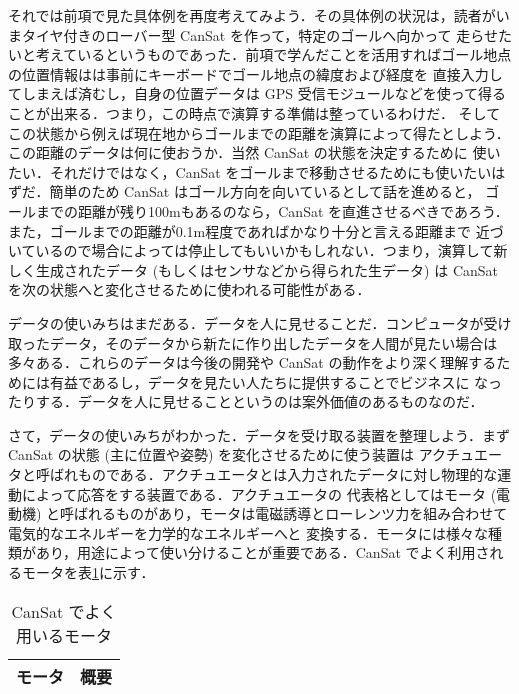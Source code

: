\documentclass[dvipdfmx]{jsarticle}
\begin{document}
それでは前項で見た具体例を再度考えてみよう．その具体例の状況は，読者がいまタイヤ付きのローバー型 CanSat を作って，特定のゴールへ向かって
走らせたいと考えているというものであった．前項で学んだことを活用すればゴール地点の位置情報はは事前にキーボードでゴール地点の緯度および経度を
直接入力してしまえば済むし，自身の位置データは GPS 受信モジュールなどを使って得ることが出来る．つまり，この時点で演算する準備は整っているわけだ．
そしてこの状態から例えば現在地からゴールまでの距離を演算によって得たとしよう．この距離のデータは何に使おうか．当然 CanSat の状態を決定するために
使いたい．それだけではなく，CanSat をゴールまで移動させるためにも使いたいはずだ．簡単のため CanSat はゴール方向を向いているとして話を進めると，
ゴールまでの距離が残り100mもあるのなら，CanSat を直進させるべきであろう．また，ゴールまでの距離が0.1m程度であればかなり十分と言える距離まで
近づいているので場合によっては停止してもいいかもしれない．つまり，演算して新しく生成されたデータ (もしくはセンサなどから得られた生データ) は
CanSat を次の状態へと変化させるために使われる可能性がある．

データの使いみちはまだある．データを人に見せることだ．コンピュータが受け取ったデータ，そのデータから新たに作り出したデータを人間が見たい場合は
多々ある．これらのデータは今後の開発や CanSat の動作をより深く理解するためには有益であるし，データを見たい人たちに提供することでビジネスに
なったりする．データを人に見せることというのは案外価値のあるものなのだ．

さて，データの使いみちがわかった．データを受け取る装置を整理しよう．まず CanSat の状態 (主に位置や姿勢) を変化させるために使う装置は
アクチュエータと呼ばれものである．アクチュエータとは入力されたデータに対し物理的な運動によって応答をする装置である．アクチュエータの
代表格としてはモータ (電動機) と呼ばれるものがあり，モータは電磁誘導とローレンツ力を組み合わせて電気的なエネルギーを力学的なエネルギーへと
変換する．モータには様々な種類があり，用途によって使い分けることが重要である．CanSat でよく利用されるモータを表\ref{tab:2.2.3-motors}に示す．

\begin{table}[htbp]
  \centering
  \caption{CanSat でよく用いるモータ}
  \begin{tabular}{c|r} \hline
    モータ & 概要 \\ \hline
  \end{tabular}
  \label{tab:2.2.3-motors}
\end{table}
\end{document}
